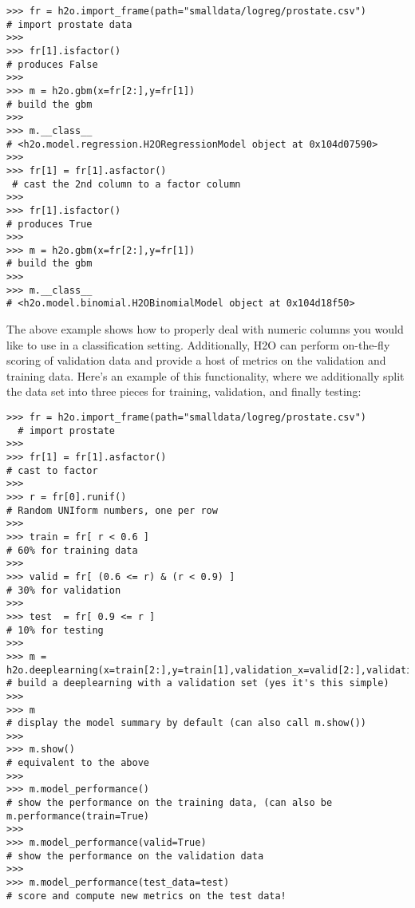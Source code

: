\begin{lstlisting}[style=python]
>>> fr = h2o.import_frame(path="smalldata/logreg/prostate.csv")  
# import prostate data
>>>
>>> fr[1].isfactor()                                             
# produces False
>>>
>>> m = h2o.gbm(x=fr[2:],y=fr[1])                                
# build the gbm
>>>
>>> m.__class__                                                  
# <h2o.model.regression.H2ORegressionModel object at 0x104d07590>
>>>
>>> fr[1] = fr[1].asfactor()                                    
 # cast the 2nd column to a factor column
>>>
>>> fr[1].isfactor()                                             
# produces True
>>>
>>> m = h2o.gbm(x=fr[2:],y=fr[1])                                
# build the gbm
>>>
>>> m.__class__                                                  
# <h2o.model.binomial.H2OBinomialModel object at 0x104d18f50>
\end{lstlisting}


The above example shows how to properly deal with numeric columns you would like to use in a classification setting. Additionally, H2O can perform on-the-fly scoring of validation data and provide a host of metrics on the validation and training data. Here's an example of this functionality, where we additionally split the data set into three pieces for training, validation, and finally testing:
\begin{lstlisting}[style=python]
>>> fr = h2o.import_frame(path="smalldata/logreg/prostate.csv")
  # import prostate
>>>
>>> fr[1] = fr[1].asfactor()                                     
# cast to factor
>>>
>>> r = fr[0].runif()                                            
# Random UNIform numbers, one per row
>>>
>>> train = fr[ r < 0.6 ]                                        
# 60% for training data
>>>
>>> valid = fr[ (0.6 <= r) & (r < 0.9) ]                         
# 30% for validation
>>>
>>> test  = fr[ 0.9 <= r ]                                       
# 10% for testing
>>>
>>> m = h2o.deeplearning(x=train[2:],y=train[1],validation_x=valid[2:],validation_y=valid[1])  # build a deeplearning with a validation set (yes it's this simple)
>>>
>>> m                                                            
# display the model summary by default (can also call m.show())
>>>
>>> m.show()                                                     
# equivalent to the above
>>>
>>> m.model_performance()                                        
# show the performance on the training data, (can also be m.performance(train=True)
>>>
>>> m.model_performance(valid=True)                              
# show the performance on the validation data
>>>
>>> m.model_performance(test_data=test)                          
# score and compute new metrics on the test data!
\end{lstlisting}


